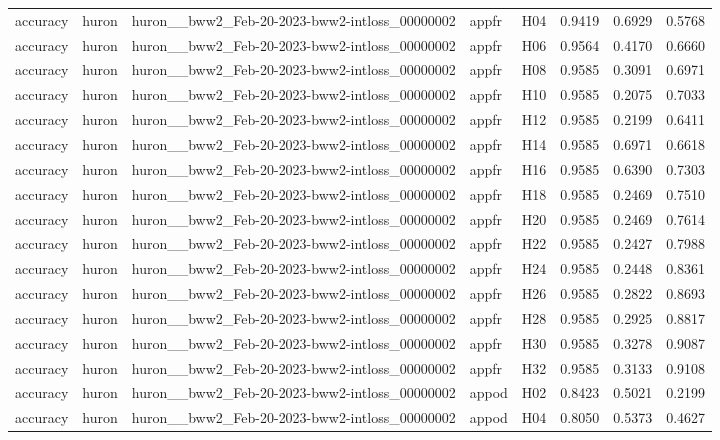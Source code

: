\begin{table}[tbp]
\begin{tabular}{lllllrrr}
accuracy & huron & huron\_\_bww2\_Feb-20-2023-bww2-intloss\_00000002 & appfr & H04 & 0.9419 & 0.6929 & 0.5768 \\
accuracy & huron & huron\_\_bww2\_Feb-20-2023-bww2-intloss\_00000002 & appfr & H06 & 0.9564 & 0.4170 & 0.6660 \\
accuracy & huron & huron\_\_bww2\_Feb-20-2023-bww2-intloss\_00000002 & appfr & H08 & 0.9585 & 0.3091 & 0.6971 \\
accuracy & huron & huron\_\_bww2\_Feb-20-2023-bww2-intloss\_00000002 & appfr & H10 & 0.9585 & 0.2075 & 0.7033 \\
accuracy & huron & huron\_\_bww2\_Feb-20-2023-bww2-intloss\_00000002 & appfr & H12 & 0.9585 & 0.2199 & 0.6411 \\
accuracy & huron & huron\_\_bww2\_Feb-20-2023-bww2-intloss\_00000002 & appfr & H14 & 0.9585 & 0.6971 & 0.6618 \\
accuracy & huron & huron\_\_bww2\_Feb-20-2023-bww2-intloss\_00000002 & appfr & H16 & 0.9585 & 0.6390 & 0.7303 \\
accuracy & huron & huron\_\_bww2\_Feb-20-2023-bww2-intloss\_00000002 & appfr & H18 & 0.9585 & 0.2469 & 0.7510 \\
accuracy & huron & huron\_\_bww2\_Feb-20-2023-bww2-intloss\_00000002 & appfr & H20 & 0.9585 & 0.2469 & 0.7614 \\
accuracy & huron & huron\_\_bww2\_Feb-20-2023-bww2-intloss\_00000002 & appfr & H22 & 0.9585 & 0.2427 & 0.7988 \\
accuracy & huron & huron\_\_bww2\_Feb-20-2023-bww2-intloss\_00000002 & appfr & H24 & 0.9585 & 0.2448 & 0.8361 \\
accuracy & huron & huron\_\_bww2\_Feb-20-2023-bww2-intloss\_00000002 & appfr & H26 & 0.9585 & 0.2822 & 0.8693 \\
accuracy & huron & huron\_\_bww2\_Feb-20-2023-bww2-intloss\_00000002 & appfr & H28 & 0.9585 & 0.2925 & 0.8817 \\
accuracy & huron & huron\_\_bww2\_Feb-20-2023-bww2-intloss\_00000002 & appfr & H30 & 0.9585 & 0.3278 & 0.9087 \\
accuracy & huron & huron\_\_bww2\_Feb-20-2023-bww2-intloss\_00000002 & appfr & H32 & 0.9585 & 0.3133 & 0.9108 \\
accuracy & huron & huron\_\_bww2\_Feb-20-2023-bww2-intloss\_00000002 & appod & H02 & 0.8423 & 0.5021 & 0.2199 \\
accuracy & huron & huron\_\_bww2\_Feb-20-2023-bww2-intloss\_00000002 & appod & H04 & 0.8050 & 0.5373 & 0.4627 \\

\end{tabular}
\end{table}
